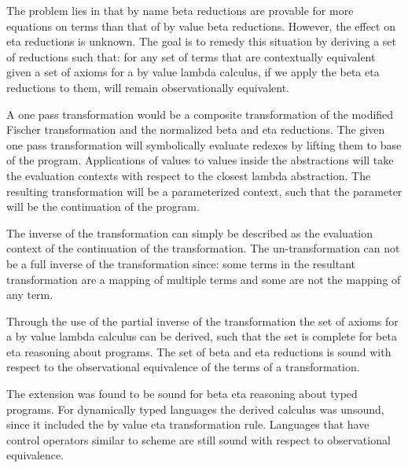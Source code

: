 The problem lies in that by name beta reductions are provable for more equations on \cps terms than that of by value beta reductions.  However, the effect on eta reductions is unknown. The goal is to remedy this situation by deriving a set of reductions such that: for any set of terms that are contextually equivalent given a set of axioms for a by value lambda calculus, if we apply the beta eta reductions to them, will remain observationally equivalent.

A one pass \cps transformation would be a composite transformation of the modified Fischer transformation and the normalized beta and eta reductions.  The given one pass transformation will symbolically evaluate redexes by lifting them to base of the program. Applications of values to values inside the abstractions will take the evaluation contexts with respect to the closest lambda abstraction. The resulting transformation will be a parameterized context, such that the parameter will be the continuation of the program.

The inverse of the \cps transformation can simply be described as the evaluation context of the continuation of the \cps transformation. The un-\cps transformation can not be a full inverse of the \cps transformation since:  some terms in the resultant transformation are a mapping of multiple terms and some are not the mapping of any term.

Through the use of the partial inverse of the \cps transformation the set of axioms for a by value lambda calculus can be derived, such that the set is complete for beta eta reasoning about \cps programs.  The set of beta and eta reductions is sound with respect to the observational equivalence of the terms of a \cps transformation.

The extension was found to be sound for beta eta reasoning about typed \cps programs.  For dynamically typed languages the derived calculus was unsound, since it included the by value eta transformation rule.  Languages that have control operators similar to scheme are still sound with respect to observational equivalence.




